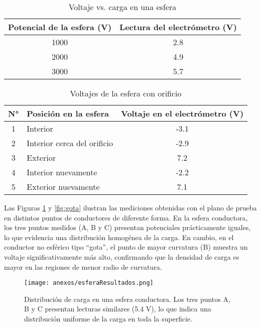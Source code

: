 \documentclass[12pt,a4paper]{article}
\begin{document}
\begin{table}[H]
\centering
\caption{Voltaje vs. carga en una esfera}
\begin{tabular}{|c|c|}
\hline
\textbf{Potencial de la esfera (V)} & \textbf{Lectura del electrómetro (V)} \\ \hline
1000 & 2.8 \\ \hline
2000 & 4.9 \\ \hline
3000 & 5.7 \\ \hline
\end{tabular}
\label{tab:voltaje_carga_esfera}
\end{table}

\begin{table}[H]
\centering
\caption{Voltajes de la esfera con orificio}
\begin{tabular}{|c|l|c|}
\hline
\textbf{N°} & \textbf{Posición en la esfera} & \textbf{Voltaje en el electrómetro (V)} \\ \hline
1 & Interior & -3.1 \\ \hline
2 & Interior cerca del orificio & -2.9 \\ \hline
3 & Exterior & 7.2 \\ \hline
4 & Interior nuevamente & -2.2 \\ \hline
5 & Exterior nuevamente & 7.1 \\ \hline
\end{tabular}
\label{tab:voltajes_esfera}
\end{table}

Las Figuras \ref{fig:esfera} y \ref{fig:gota} ilustran las mediciones obtenidas con el plano de prueba en distintos puntos de conductores de diferente forma. En la esfera conductora, los tres puntos medidos (A, B y C) presentan potenciales prácticamente iguales, lo que evidencia una distribución homogénea de la carga.  
En cambio, en el conductor no esférico tipo “gota”, el punto de mayor curvatura (B) muestra un voltaje significativamente más alto, confirmando que la densidad de carga es mayor en las regiones de menor radio de curvatura.


\begin{figure}[H]
    \centering
    \texttt{[image: anexos/esferaResultados.png]}
    \caption{Distribución de carga en una esfera conductora. Los tres puntos A, B y C presentan lecturas similares (5.4 V), lo que indica una distribución uniforme de la carga en toda la superficie.}
    \label{fig:esfera}
\end{figure}
\end{document}
